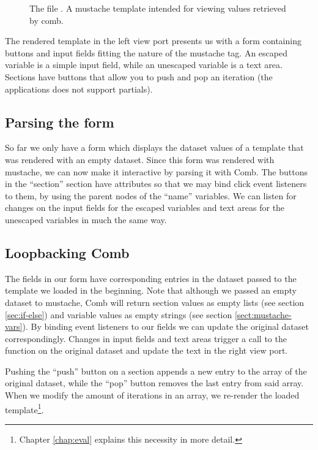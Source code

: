 \documentclass[thesis.tex]{subfiles}
\begin{document}
\begin{figure}
	\centering
	
	\caption{The file . A mustache template intended for viewing values retrieved by comb.}
	\label{fig:mustache.mustache}
\end{figure}

The rendered template in the left view port presents us with a form containing
buttons and input fields fitting the nature of the mustache tag.
An escaped variable is a simple input field,
while an unescaped variable is a text area.
Sections have buttons that allow you to push and pop an iteration
(the applications does not support partials).

\subsection{Parsing the form}

So far we only have a form which displays the dataset values of a template that
was rendered with an empty dataset.
Since this form was rendered with mustache, we can now make it interactive by
parsing it with Comb. The buttons in the ``section'' section have
 attributes so that we may bind click event listeners to
them, by using the parent nodes of the ``name'' variables. We can listen
for changes on the input fields for the escaped variables and text areas for the
unescaped variables in much the same way.

\subsection{Loopbacking Comb}

The fields in our form have corresponding entries in the dataset passed to
the template we loaded in the beginning.
Note that although we passed an empty dataset to mustache, Comb will return
section values as empty lists (see section \ref{sec:if-else}) and
variable values as empty strings (see section \ref{sect:mustache-vars}).
By binding event listeners to our fields we can update the original dataset
correspondingly. Changes in input fields and text areas trigger a call to the
 function on the original dataset and update the text in the
right view port.

Pushing the ``push'' button on a section appends a new entry to the array of the
original dataset, while the ``pop'' button removes the last entry from said array.
When we modify the amount of iterations in an array, we re-render the loaded
template\footnote{
	Chapter \ref{chap:eval} explains this necessity in more detail.
}.
\end{document}
